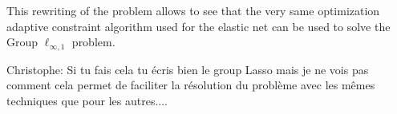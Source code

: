 This  rewriting  of the  problem  allows to  see  that  the very  same
optimization adaptive  constraint algorithm  used for the  elastic net
can be used to solve the Group  $\ell_{\infty,1}$ problem.


{

Christophe: Si  tu fais cela tu écris  bien le group Lasso  mais je ne
vois pas comment cela permet de faciliter la résolution du problème avec les mêmes
techniques que pour les autres....
}

{\color{blue}{Christophe:  une version group  oscar devrait  donner de
    meilleurs résultats}}
\fi